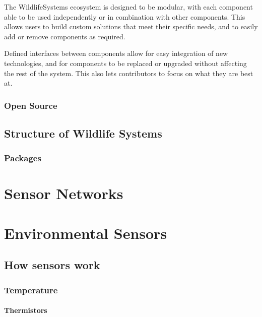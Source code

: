\documentclass[
]{book}
\begin{document}
The WildlifeSystems ecosystem is designed to be modular, with each component able to be used independently or in combination with other components. This allows users to build custom solutions that meet their specific needs, and to easily add or remove components as required.

Defined interfaces between components allow for easy integration of new technologies, and for components to be replaced or upgraded without affecting the rest of the system. This also lets contributors to focus on what they are best at.

\subsection{Open Source}\label{open-source}

\section{Structure of Wildlife Systems}\label{structure-of-wildlife-systems}

\subsection{Packages}\label{packages}

\chapter{Sensor Networks}\label{sensor-networks}

\chapter{Environmental Sensors}\label{environmental-sensors}

\section{How sensors work}\label{how-sensors-work}

\subsection{Temperature}\label{temperature}

\subsubsection{Thermistors}\label{thermistors}
\end{document}
